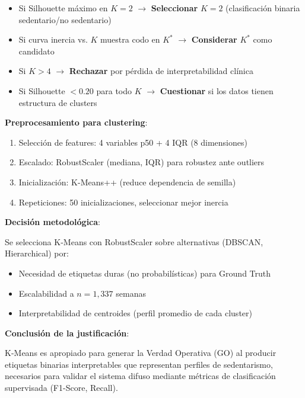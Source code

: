 \documentclass[12pt,letterpaper,twoside]{report}
\begin{document}
\begin{calculobox}
\begin{reglabox}
\begin{itemize}[noitemsep]
    \item Si Silhouette máximo en $K=2$ $\to$ \textbf{Seleccionar} $K=2$ (clasificación binaria sedentario/no sedentario)
    \item Si curva inercia vs. $K$ muestra codo en $K^*$ $\to$ \textbf{Considerar} $K^*$ como candidato
    \item Si $K > 4$ $\to$ \textbf{Rechazar} por pérdida de interpretabilidad clínica
    \item Si Silhouette $< 0.20$ para todo $K$ $\to$ \textbf{Cuestionar} si los datos tienen estructura de clusters
\end{itemize}
\end{reglabox}

\begin{calculobox}
\textbf{Preprocesamiento para clustering}:

\begin{enumerate}[noitemsep]
    \item Selección de features: 4 variables p50 + 4 IQR (8 dimensiones)
    \item Escalado: RobustScaler (mediana, IQR) para robustez ante outliers
    \item Inicialización: K-Means++ (reduce dependencia de semilla)
    \item Repeticiones: 50 inicializaciones, seleccionar mejor inercia
\end{enumerate}
\end{calculobox}

\begin{decisionbox}
\textbf{Decisión metodológica}:

Se selecciona K-Means con RobustScaler sobre alternativas (DBSCAN, Hierarchical) por:
\begin{itemize}[noitemsep]
    \item Necesidad de etiquetas duras (no probabilísticas) para Ground Truth
    \item Escalabilidad a $n=1,337$ semanas
    \item Interpretabilidad de centroides (perfil promedio de cada cluster)
\end{itemize}
\end{decisionbox}

\begin{conclusionbox}
\textbf{Conclusión de la justificación}:

K-Means es apropiado para generar la Verdad Operativa (GO) al producir etiquetas binarias interpretables que representan perfiles de sedentarismo, necesarios para validar el sistema difuso mediante métricas de clasificación supervisada (F1-Score, Recall).
\end{conclusionbox}


\end{calculobox}
\end{document}
